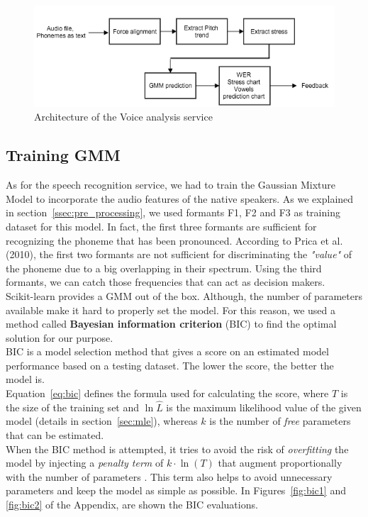 \begin{figure}[!ht]
	\centering
	\includegraphics[scale=0.6]{Figures/gmm_service.png}
	\caption{Architecture of the Voice analysis service}
	\label{fig:gmm_service}
\end{figure}

\subsection{Training GMM}
\noindent As for the speech recognition service, we had to train the Gaussian Mixture Model to incorporate the audio features of the native speakers. As we explained in section~\ref{ssec:pre_processing}, we used formants F1, F2 and F3 as training dataset for this model. In fact, the first three formants are sufficient for recognizing the phoneme that has been pronounced. According to Prica et al. (2010), the first two formants are not sufficient for discriminating the \textit{"value"} of the phoneme due to a big overlapping in their spectrum. Using the third formants, we can catch those frequencies that can act as decision makers. \\

\noindent Scikit-learn provides a GMM out of the box. Although, the number of parameters available make it hard to properly set the model. For this reason, we used a method called \textbf{Bayesian information criterion} (BIC) to find the optimal solution for our purpose. \\

\noindent BIC is a model selection method that gives a score on an estimated model performance based on a testing dataset. The lower the score, the better the model is. \\
\noindent Equation~\ref{eq:bic} defines the formula used for calculating the score, where $T$ is the size of the training set and $\ln{\hat L}$ is the maximum likelihood value of the given model (details in section~\ref{sec:mle}), whereas $k$ is the number of \textit{free} parameters that can be estimated. \\
\noindent When the BIC method is attempted, it tries to avoid the risk of \textit{overfitting} the model by injecting a \textit{penalty term} of $k \cdot \ln(T)$ that augment proportionally with the number of parameters \cite{bic_info}. This term also helps to avoid unnecessary parameters and keep the model as simple as possible. In Figures~\ref{fig:bic1} and \ref{fig:bic2} of the Appendix, are shown the BIC evaluations.

